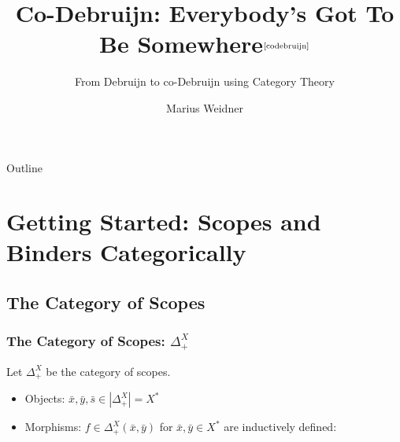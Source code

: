 \documentclass[aspectratio=169]{beamer}
\title{Co-Debruijn: Everybody's Got To Be Somewhere$^{\text{\cite{codebruijn}}}$}
\subtitle{From Debruijn to co-Debruijn using Category Theory}
\institute[Uni Freiburg]{Chair of Programming Languages, University of
  Freiburg}
\author{Marius Weidner}
\theoremstyle{remarkstyle}
\begin{document}
\begin{frame}
  \titlepage{}
\end{frame}

\begin{frame}{Outline}
  \tableofcontents
\end{frame}

\section{Getting Started: Scopes and Binders Categorically}
\subsection{The Category of Scopes}

\begin{frame}[fragile]
  \frametitle{The Category of Scopes: $Δ_+^X$}
  \begin{definition}
    Let $Δ_+^X$ be the category of scopes.
    \begin{itemize}
      \item Objects: $\bar{x}, \bar{y}, \bar{s} ∈ |Δ_+^X| = X^*$
      \item Morphisms: $f ∈ Δ_+^X(\bar{x}, \bar{y})$ for $\bar{x}, \bar{y} ∈ X^*$ are inductively defined:
    \end{itemize}
    \begin{columns}
      \begin{column}{0.04\textwidth}
      \end{column}
      \begin{column}{0.2\textwidth}
        \begin{center}
        \end{center}
      \end{column}
      \begin{column}{0.2\textwidth}
        \begin{center}
        \end{center}
      \end{column}
      \begin{column}{0.2\textwidth}
        \begin{center}
        \end{center}
      \end{column}

\end{columns}
\end{definition}
\end{frame}
\end{document}
